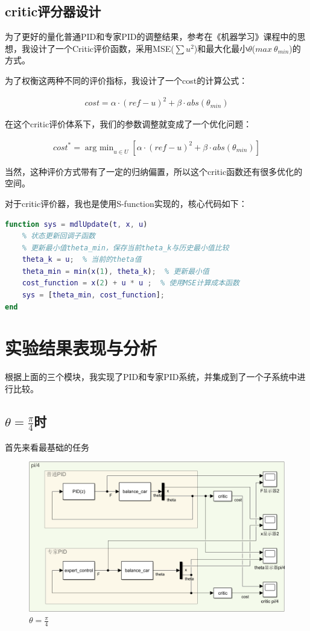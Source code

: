 \documentclass[12pt,a4paper,UTF8]{article}
\begin{document}
\clearpage
\subsection{critic评分器设计}

为了更好的量化普通PID和专家PID的调整结果，参考在《机器学习》课程中的思想，我设计了一个Critic评价函数，采用MSE($\sum u^2$)和最大化最小$\theta$($max \ \theta_{min}$)的方式。

为了权衡这两种不同的评价指标，我设计了一个cost的计算公式：

\begin{align}
cost = \alpha \cdot (ref - u)^2 + \beta \cdot abs(\theta_{min})
\end{align}

在这个critic评价体系下，我们的参数调整就变成了一个优化问题：

\begin{align}
cost^* = \mathop{arg\ min }_{u \in U} \left[\alpha \cdot (ref - u)^2 + \beta \cdot abs(\theta_{min})\right]
\end{align}

当然，这种评价方式带有了一定的归纳偏置，所以这个critic函数还有很多优化的空间。


对于critic评价器，我也是使用S-function实现的，核心代码如下：
\begin{lstlisting}[language=Matlab,caption=critic核心代码]
function sys = mdlUpdate(t, x, u)
    % 状态更新回调子函数
    % 更新最小值theta_min，保存当前theta_k与历史最小值比较
    theta_k = u;  % 当前的theta值
    theta_min = min(x(1), theta_k);  % 更新最小值
    cost_function = x(2) + u * u ;  % 使用MSE计算成本函数
    sys = [theta_min, cost_function];
end
\end{lstlisting}

\clearpage
\section{实验结果表现与分析}
根据上面的三个模块，我实现了PID和专家PID系统，并集成到了一个子系统中进行比较。

\subsection{$\theta = \frac{\pi}{4}$时}
首先来看最基础的任务

\begin{figure}[htbp]
    \centering
    \includegraphics[width=1\linewidth]{figures/k1.png}
    \caption{$\theta = \frac{\pi}{4}$}
\end{figure}
\end{document}
